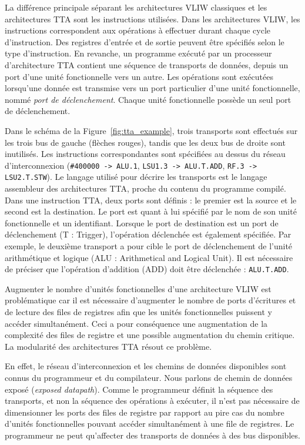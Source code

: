 La différence principale séparant les architectures VLIW classiques et les architectures TTA sont les instructions utilisées. Dans les architectures VLIW, les instructions correspondent aux opérations à effectuer durant chaque cycle d'instruction. Des registres d'entrée et de sortie peuvent être spécifiés selon le type d'instruction. En revanche, un programme exécuté par un processeur d'architecture TTA contient une séquence de transports de données, depuis un port d'une unité fonctionnelle vers un autre. Les opérations sont exécutées lorsqu'une donnée est transmise vers un port particulier d'une unité fonctionnelle, nommé \textit{port de déclenchement}. Chaque unité fonctionnelle possède un seul port de déclenchement.

Dans le schéma de la Figure~\ref{fig:tta_example}, trois transports sont effectués sur les trois bus de gauche (flèches rouges), tandis que les deux bus de droite sont inutilisés. Les instructions correspondantes sont spécifiées au dessus du réseau d'interconnexion (\texttt{\#400000 -> ALU.1}, \texttt{LSU1.3 -> ALU.T.ADD}, \texttt{RF.3 -> LSU2.T.STW}). Le langage utilisé pour décrire les transports est le langage assembleur des architectures TTA, proche du contenu du programme compilé. Dans une instruction TTA, deux ports sont définis : le premier est la source et le second est la destination. Le port est quant à lui spécifié par le nom de son unité fonctionnelle et un identifiant. Lorsque le port de destination est un port de déclenchement (T : Trigger), l'opération déclenchée est également spécifiée. Par exemple, le deuxième transport a pour cible le port de déclenchement de l'unité arithmétique et logique (ALU : Arithmetical and Logical Unit). Il est nécessaire de préciser que l'opération d'addition (ADD) doit être déclenchée : \texttt{ALU.T.ADD}.

Augmenter le nombre d'unités fonctionnelles d'une architecture VLIW est problématique car il est nécessaire d'augmenter le nombre de ports d'écritures et de lecture des files de registres afin que les unités fonctionnelles puissent y accéder simultanément. Ceci a pour conséquence une augmentation de la complexité des files de registre et une possible augmentation du chemin critique.
La modularité des architectures TTA résout ce problème.

En effet, le réseau d'interconnexion et les chemins de données disponibles sont connus du programmeur et du compilateur. Nous parlons de \og chemin de données exposé \fg (\textit{exposed datapath}). Comme le programmeur définit la séquence des transports, et non la séquence des opérations à exécuter, il n'est pas nécessaire de dimensionner les ports des files de registre par rapport au pire cas du nombre d'unités fonctionnelles pouvant accéder simultanément à une file de registres. Le programmeur ne peut qu'affecter des transports de données à des bus disponibles.

